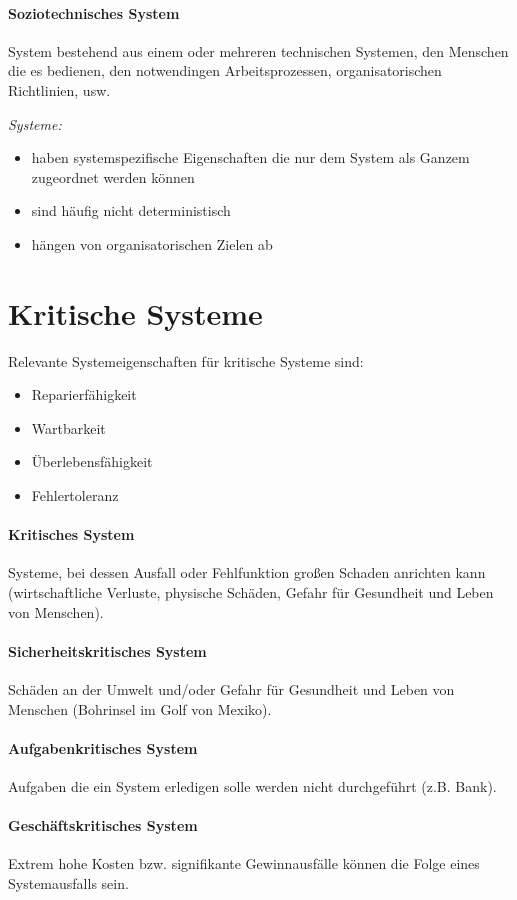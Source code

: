\paragraph{Soziotechnisches System} System bestehend aus einem oder mehreren technischen Systemen, den Menschen die es bedienen, den notwendingen Arbeitsprozessen, organisatorischen Richtlinien, usw.

\emph{Systeme:}
\begin{itemize}
	\item haben systemspezifische Eigenschaften die nur dem System als Ganzem zugeordnet werden können
	\item sind häufig nicht deterministisch
	\item hängen von organisatorischen Zielen ab
\end{itemize}

\section{Kritische Systeme}
Relevante Systemeigenschaften für kritische Systeme sind:
\begin{itemize}
	\item Reparierfähigkeit
	\item Wartbarkeit
	\item Überlebensfähigkeit
	\item Fehlertoleranz
\end{itemize}

\paragraph{Kritisches System}
Systeme, bei dessen Ausfall oder Fehlfunktion großen Schaden anrichten kann (wirtschaftliche Verluste, physische Schäden, Gefahr für Gesundheit und Leben von Menschen).

\paragraph{Sicherheitskritisches System}
Schäden an der Umwelt und/oder Gefahr für Gesundheit und Leben von Menschen (Bohrinsel im Golf von Mexiko).

\paragraph{Aufgabenkritisches System}
Aufgaben die ein System erledigen solle werden nicht durchgeführt (z.B. Bank).

\paragraph{Geschäftskritisches System}
Extrem hohe Kosten bzw. signifikante Gewinnausfälle können die Folge eines Systemausfalls sein.


